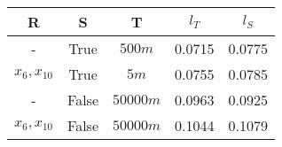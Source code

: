 \begin{tabular}{| c c | c | c c |}
\hline
R & S & T & $l_T$ & $l_S$ \\
\hline
- & True & $500m$ & 0.0715 & 0.0775 \\
$x_{6}, x_{10}$ & True & $5m$ & 0.0755 & 0.0785 \\
- & False & $50000m$ & 0.0963 & 0.0925 \\
$x_{6}, x_{10}$ & False & $50000m$ & 0.1044 & 0.1079 \\
\hline
\end{tabular}

